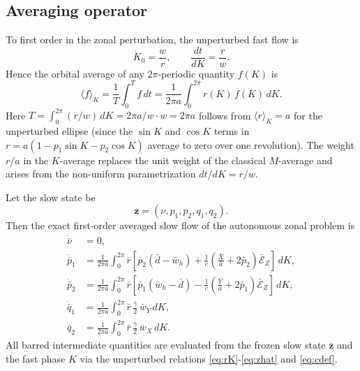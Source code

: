 \documentclass[11pt]{article}
\begin{document}
\subsection{Averaging operator}

To first order in the zonal perturbation, the unperturbed fast flow is
\begin{equation}
\dot{K}_0 = \frac{w}{r},
\qquad
\frac{dt}{dK} = \frac{r}{w}.
\end{equation}
Hence the orbital average of any $2\pi$-periodic quantity $f(K)$ is
\begin{equation}
\langle f \rangle_K
= \frac{1}{T}\int_0^T f\,dt
= \frac{1}{2\pi a}\int_0^{2\pi} r(K)\,f(K)\,dK.
\label{eq:avg_operator}
\end{equation}
Here $T = \int_0^{2\pi}(r/w)\,dK = 2\pi a/w \cdot w = 2\pi a$ follows from
$\langle r\rangle_K = a$ for the unperturbed ellipse (since the $\sin K$ and
$\cos K$ terms in $r = a(1-p_1\sin K - p_2\cos K)$ average to zero over one
revolution). The weight $r/a$ in the $K$-average replaces the unit weight of
the classical $M$-average and arises from the non-uniform parametrization
$dt/dK = r/w$.

Let the slow state be
\begin{equation}
\bm{z} = (\nu,p_1,p_2,q_1,q_2).
\end{equation}
Then the exact first-order averaged slow flow of the autonomous zonal problem is
\begin{align}
\dot{\bar\nu} &= 0, \\
\dot{\bar p}_1 &=
\frac{1}{2\pi \bar a}\int_0^{2\pi} \bar r
\left[
\bar p_2(\bar d-\bar w_h)
+ \frac{1}{\bar c}\left(\frac{\bar X}{\bar a}+2\bar p_2\right)\bar{\mathcal E}_Z
\right]\,dK, \label{eq:avg_p1_general}\\
\dot{\bar p}_2 &=
\frac{1}{2\pi \bar a}\int_0^{2\pi} \bar r
\left[
\bar p_1(\bar w_h-\bar d)
- \frac{1}{\bar c}\left(\frac{\bar Y}{\bar a}+2\bar p_1\right)\bar{\mathcal E}_Z
\right]\,dK, \label{eq:avg_p2_general}\\
\dot{\bar q}_1 &=
\frac{1}{2\pi \bar a}\int_0^{2\pi}
\bar r \,\frac{\bar\gamma}{2}\,\bar w_Y\,dK, \label{eq:avg_q1_general}\\
\dot{\bar q}_2 &=
\frac{1}{2\pi \bar a}\int_0^{2\pi}
\bar r \,\frac{\bar\gamma}{2}\,\bar w_X\,dK. \label{eq:avg_q2_general}
\end{align}
All barred intermediate quantities are evaluated from the frozen slow state
$\bar{\bm z}$ and the fast phase $K$ via the unperturbed relations
\eqref{eq:rK}-\eqref{eq:zhat} and \eqref{eq:cdef}.
\end{document}
